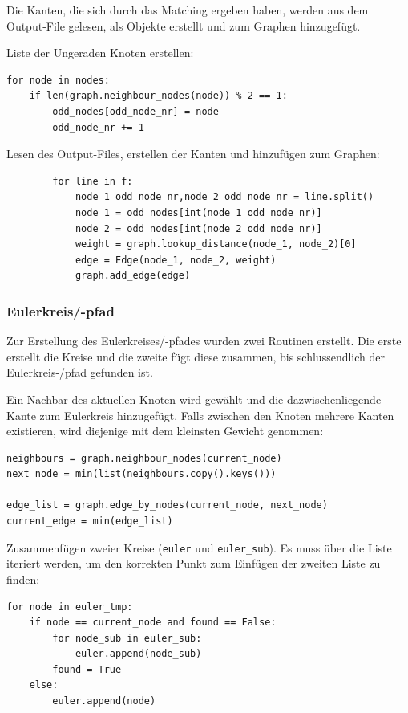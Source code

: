 \documentclass[11pt,a4paper]{article}
\begin{document}
Die Kanten, die sich durch das Matching ergeben haben, werden aus dem Output-File gelesen, als Objekte erstellt und zum Graphen hinzugefügt.

\begin{flushleft}
    Liste der Ungeraden Knoten erstellen:
\end{flushleft}
\begin{verbatim}
for node in nodes:
    if len(graph.neighbour_nodes(node)) % 2 == 1:
        odd_nodes[odd_node_nr] = node
        odd_node_nr += 1
\end{verbatim}

\begin{flushleft}
    Lesen des Output-Files, erstellen der Kanten und hinzufügen zum Graphen:
\end{flushleft}
\begin{verbatim}
        for line in f:
            node_1_odd_node_nr,node_2_odd_node_nr = line.split()
            node_1 = odd_nodes[int(node_1_odd_node_nr)] 
            node_2 = odd_nodes[int(node_2_odd_node_nr)]
            weight = graph.lookup_distance(node_1, node_2)[0]
            edge = Edge(node_1, node_2, weight)
            graph.add_edge(edge)
\end{verbatim}

\subsubsection{Eulerkreis/-pfad}
Zur Erstellung des Eulerkreises/-pfades wurden zwei Routinen erstellt. Die erste erstellt die Kreise und die zweite fügt diese zusammen, bis schlussendlich der Eulerkreis-/pfad gefunden ist.

\begin{flushleft}
   Ein Nachbar des aktuellen Knoten wird gewählt und die dazwischenliegende Kante zum Eulerkreis hinzugefügt. Falls zwischen den Knoten mehrere Kanten existieren, wird diejenige mit dem kleinsten Gewicht genommen:
\end{flushleft}
\begin{verbatim}
neighbours = graph.neighbour_nodes(current_node)
next_node = min(list(neighbours.copy().keys()))

edge_list = graph.edge_by_nodes(current_node, next_node)
current_edge = min(edge_list)
\end{verbatim}

\begin{flushleft}
    Zusammenfügen zweier Kreise (\texttt{euler} und \texttt{euler\_sub}). Es muss über die Liste iteriert werden, um den korrekten Punkt zum Einfügen der zweiten Liste zu finden:
\end{flushleft}
\begin{verbatim}
for node in euler_tmp:
    if node == current_node and found == False:
        for node_sub in euler_sub:
            euler.append(node_sub)
        found = True
    else:
        euler.append(node)
\end{verbatim}
\end{document}

